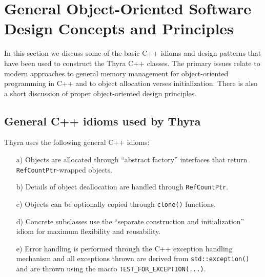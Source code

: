 \documentclass[pdf,ps2pdf,11pt]{SANDreport}
\begin{document}
%
\section{General Object-Oriented Software Design Concepts and Principles}
\label{tsfcore:sec:general_software_concepts}
%
 
In this section we discuss some of the basic C++ idioms and design
patterns that have been used to construct the Thyra C++ classes.
The primary issues relate to modern approaches to general memory
management for object-oriented programming in C++ and to object
allocation verses initialization.  There is also a short discussion of
proper object-oriented design principles.

%
\subsection{General C++ idioms used by Thyra}
\label{tsfcore:sec:tsfcore-c++-idioms}
%

Thyra uses the following general C++ idioms:

\begin{enumerate}

{}\item[a)] Objects are allocated through ``abstract factory'' interfaces
that return {}\texttt{Ref\-Count\-Ptr}-wrapped objects.

{}\item[b)] Details of object deallocation are handled through
{}\texttt{Ref\-Count\-Ptr}.

{}\item[c)] Objects can be optionally copied through {}\texttt{clone()}
functions.

{}\item[d)] Concrete subclasses use the ``separate construction and
initialization'' idiom for maximum flexibility and reusability.

{}\item[e)] Error handling is performed through the C++ exception
handling mechanism and all exceptions thrown are derived from
{}\texttt{std\-::exception()} and are thrown using the macro
{}\texttt{TEST\-\_FOR\-\_EXCEPTION(...)}.

\end{enumerate}
\end{document}
